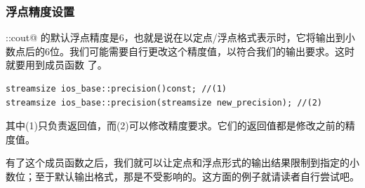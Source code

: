 \subsubsection*{浮点精度设置}
\lstinline@std::cout@ 的默认浮点精度是6，也就是说在以定点/浮点格式表示时，它将输出到小数点后的6位。我们可能需要自行更改这个精度值，以符合我们的输出要求。这时就要用到成员函数 \lstinline@precision@ 了。
\begin{lstlisting}
streamsize ios_base::precision()const; //(1)	
streamsize ios_base::precision(streamsize new_precision); //(2)
\end{lstlisting}
其中(1)只负责返回值，而(2)可以修改精度要求。它们的返回值都是修改之前的精度值。\par
有了这个成员函数之后，我们就可以让定点和浮点形式的输出结果限制到指定的小数位；至于默认输出格式，那是不受影响的。这方面的例子就请读者自行尝试吧。\par
